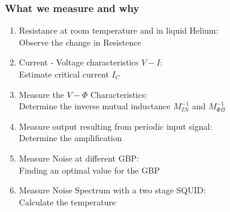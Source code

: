 \documentclass[16pt]{beamer}
\begin{document}
	\begin{frame}
		\frametitle{What we measure and why}
		\begin{enumerate}
			\item Resistance at room temperature and in liquid Helium:\\
			Observe the change in Resistence
			\item Current - Voltage characteristics $V-I$: \\
			Estimate critical current $I_C$
			\item Measure the $V-\Phi$ Characteristics:\\
			Determine the inverse mutual inductance $ M_{IN}^{-1}$ and $M_{\Phi B}^{-1}$
			\item Measure output resulting from  periodic input signal: \\
			Determine the amplification
			\item Measure Noise at different GBP:\\
			Finding an optimal value for the GBP
			\item Measure Noise Spectrum with a two stage SQUID: \\
			Calculate the temperature
			
		\end{enumerate}
	\end{frame}
		
\end{document}
